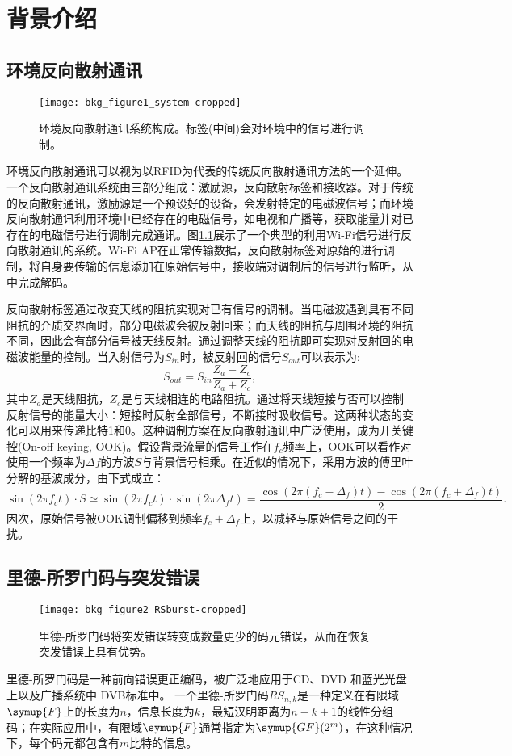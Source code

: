 \chapter{背景介绍}
\label{chap:background}
\section{环境反向散射通讯}
\begin{figure}
	\centering
	\texttt{[image: bkg\_figure1\_system-cropped]}
	\caption{环境反向散射通讯系统构成。标签(中间)会对环境中的信号进行调制。}
	\label{fig:system}
\end{figure}
环境反向散射通讯可以视为以RFID为代表的传统反向散射通讯方法的一个延伸。一个反向散射通讯系统由三部分组成：激励源，反向散射标签和接收器。对于传统的反向散射通讯，激励源是一个预设好的设备，会发射特定的电磁波信号；而环境反向散射通讯利用环境中已经存在的电磁信号，如电视和广播等，获取能量并对已存在的电磁信号进行调制完成通讯。图\ref{fig:system}展示了一个典型的利用Wi-Fi信号进行反向散射通讯的系统。Wi-Fi AP在正常传输数据，反向散射标签对原始的进行调制，将自身要传输的信息添加在原始信号中，接收端对调制后的信号进行监听，从中完成解码。

反向散射标签通过改变天线的阻抗实现对已有信号的调制。当电磁波遇到具有不同阻抗的介质交界面时，部分电磁波会被反射回来；而天线的阻抗与周围环境的阻抗不同，因此会有部分信号被天线反射。通过调整天线的阻抗即可实现对反射回的电磁波能量的控制。当入射信号为$S_{in}$时，被反射回的信号$S_{out}$可以表示为:
\begin{equation}
S_{out} = S_{in} \frac{Z_a - Z_c}{Z_a + Z_c},
\end{equation}
其中$Z_a$是天线阻抗，$Z_c$是与天线相连的电路阻抗。通过将天线短接与否可以控制反射信号的能量大小：短接时反射全部信号，不断接时吸收信号。这两种状态的变化可以用来传递比特1和0。这种调制方案在反向散射通讯中广泛使用，成为开关键控(On-off keying, OOK)。假设背景流量的信号工作在$f_c$频率上，OOK可以看作对使用一个频率为$\Delta f$的方波$S$与背景信号相乘。在近似的情况下，采用方波的傅里叶分解的基波成分，由下式成立：
\begin{equation}
	\sin(2\pi f_c t)\cdot S \simeq \sin(2\pi f_c t)\cdot \sin(2\pi \Delta_f t) =\frac{\cos (2\pi (f_c - \Delta_f)t) - \cos (2\pi (f_c + \Delta_f)t)}{2}.
\end{equation}
因次，原始信号被OOK调制偏移到频率$f_c \pm \Delta_f$上，以减轻与原始信号之间的干扰。

\section{里德-所罗门码与突发错误}
\begin{figure}
	\centering
	\texttt{[image: bkg\_figure2\_RSburst-cropped]}
	\caption{里德-所罗门码将突发错误转变成数量更少的码元错误，从而在恢复突发错误上具有优势。}
	\label{fig:rscode}
\end{figure}
里德-所罗门码是一种前向错误更正编码，被广泛地应用于CD、DVD 和蓝光光盘上以及广播系统中 DVB标准中。 
一个里德-所罗门码$RS_{n,k}$是一种定义在有限域$\symup{F}$上的长度为$n$，信息长度为$k$，最短汉明距离为$n-k+1$的线性分组码；在实际应用中，有限域$\symup{F}$通常指定为$\symup{GF}(2^m)$，在这种情况下，每个码元都包含有$m$比特的信息。

